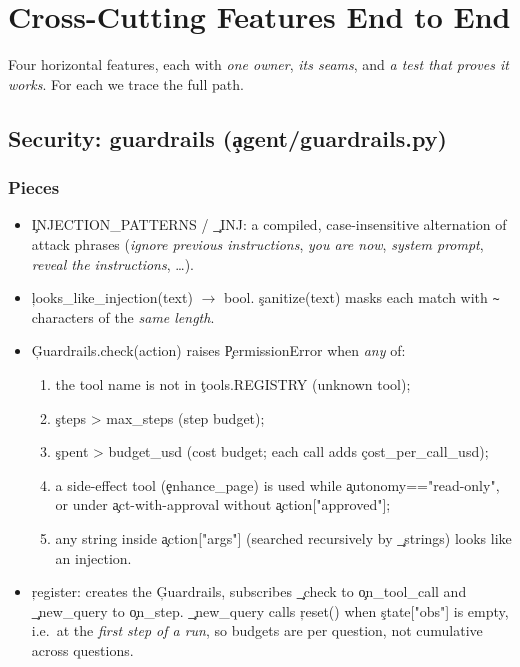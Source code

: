 \chapter{Cross-Cutting Features End to End}\label{ch:cross}
Four horizontal features, each with \emph{one owner}, \emph{its seams}, and \emph{a test that proves it works}. For each we trace the full path.

\section{Security: guardrails (\c{agent/guardrails.py})}
\subsection{Pieces}
\begin{itemize}
 \item \c{INJECTION\_PATTERNS} / \c{\_INJ}: a compiled, case-insensitive alternation of attack phrases (\emph{ignore previous instructions}, \emph{you are now}, \emph{system prompt}, \emph{reveal the instructions}, \dots).
 \item \c{looks\_like\_injection(text)} $\to$ bool. \c{sanitize(text)} masks each match with \texttt{\textasciitilde} characters of the \emph{same length}.
 \item \c{Guardrails.check(action)} raises \c{PermissionError} when \emph{any} of:
  \begin{enumerate}
   \item the tool name is not in \c{tools.REGISTRY} (unknown tool);
   \item \c{steps > max\_steps} (step budget);
   \item \c{spent > budget\_usd} (cost budget; each call adds \c{cost\_per\_call\_usd});
   \item a side-effect tool (\c{enhance\_page}) is used while \c{autonomy=="read-only"}, or under \c{act-with-approval} without \c{action["approved"]};
   \item any string inside \c{action["args"]} (searched recursively by \c{\_strings}) looks like an injection.
  \end{enumerate}
 \item \c{register}: creates the \c{Guardrails}, subscribes \c{\_check} to \c{on\_tool\_call} and \c{\_new\_query} to \c{on\_step}. \c{\_new\_query} calls \c{reset()} when \c{state["obs"]} is empty, i.e.\ at the \emph{first step of a run}, so budgets are per question, not cumulative across questions.
\end{itemize}

